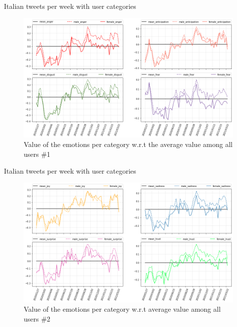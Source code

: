 \documentclass[8pt]{beamer}  %
\begin{document}
\begin{frame}{Italian tweets per week with user categories}
	
	\begin{figure}[h]
    	\includegraphics[scale=.30]{assets/img/it_emotions_per_category_wrt_total_proportion_subplots_1.png}
    	\caption{Value of the emotions per category w.r.t the average value among all users \#1}
    	\label{fig:it_emotion_weekly_per_category_proportion_subplot_1}
    \end{figure}
	
\end{frame}

\begin{frame}{Italian tweets per week with user categories} 
	
	\begin{figure}[h]
    	\includegraphics[scale=.30]{assets/img/it_emotions_per_category_wrt_total_proportion_subplots_2.png}
    	\caption{Value of the emotions per category w.r.t average value among all users \#2}
    	\label{fig:it_emotion_weekly_per_category_proportion_subplot_2}
    \end{figure}
	
\end{frame}
\end{document}
